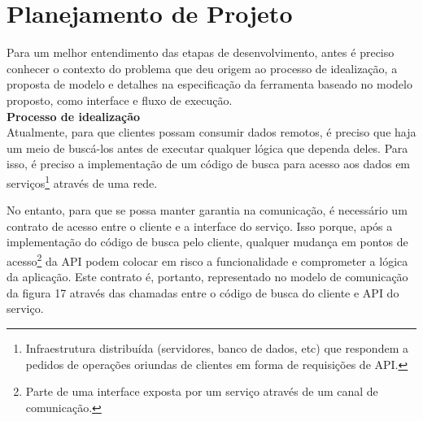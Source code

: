 \section{Planejamento de Projeto}

Para um melhor entendimento das etapas de desenvolvimento, antes é preciso conhecer o contexto do problema que deu origem ao processo de idealização, a proposta de modelo e detalhes na especificação da ferramenta baseado no modelo proposto, como interface e fluxo de execução. \\

\textbf{Processo de idealização} \\

Atualmente, para que clientes possam consumir dados remotos, é preciso que haja um meio de buscá-los antes de executar qualquer lógica que dependa deles. Para isso, é preciso a implementação de um código de busca para acesso aos dados em serviços\footnote{
  Infraestrutura distribuída (servidores, banco de dados, etc) que respondem a pedidos de operações oriundas de clientes em forma de requisições de API.
} através de uma rede.

No entanto, para que se possa manter garantia na comunicação, é necessário um contrato de acesso entre o cliente e a interface do serviço. Isso porque, após a implementação do código de busca pelo cliente, qualquer mudança em pontos de acesso\footnote{
  Parte de uma interface exposta por um serviço através de um canal de comunicação.
} da API podem colocar em risco a funcionalidade e comprometer a lógica da aplicação. Este contrato é, portanto, representado no modelo de comunicação da figura 17 através das chamadas entre o código de busca do cliente e API do serviço.

